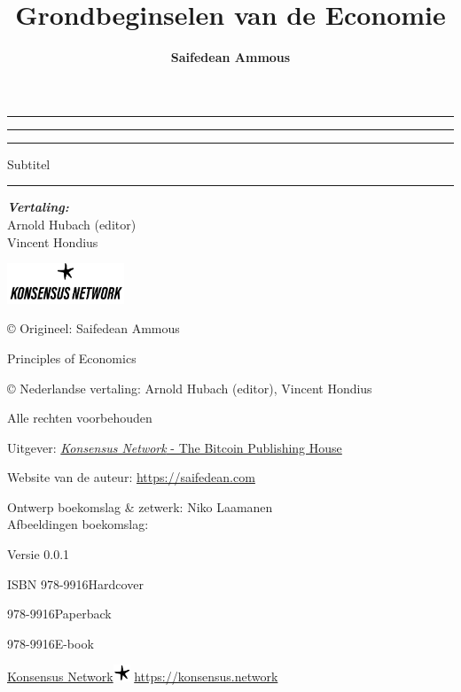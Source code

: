 \documentclass[smalldemyvopaper,10pt,twoside,onecolumn,openright,extrafontsizes]{memoir}
\title{Grondbeginselen van de Economie}
\author{\textbf{Saifedean Ammous}}
\newcommand{\subtitle}{Subtitel}
\newcommand{\ISBNHC}{978-9916}
\newcommand{\ISBNSC}{978-9916}
\newcommand{\ISBNEBOOK}{978-9916}
\newcommand{\press}{Konsensus Network}
\newcommand{\editor}{Arnold Hubach (editor)}
\newcommand{\translatorone}{Vincent Hondius}
\newcommand{\translators}{
\textbf{Vertaling:}\\
\editor\\
\translatorone\\

}
\newcommand*\halftitlepage{\begingroup %
  \setlength\drop{0.1\textheight}
  \begin{center}
  \vspace*{\drop}
  \rule{\textwidth}{0in}\par
  {\Large\textsc\thetitle\par}
  \rule{\textwidth}{0in}\par
  \vfill
  \end{center}
\endgroup}
\newlength\drop
\newcommand*\titleM{\begingroup %
  \setlength\drop{0.15\textheight}
  \begin{center}
  \vspace*{\drop}
  \rule{\textwidth}{0in}\par
  {\huge\textsc\thetitle\par}
  {\Large\textsc\subtitle\par}
  \rule{5.5cm}{0.3mm}\par
  {\large\textit\theauthor\par}
  \vspace{2mm}
  {\footnotesize\textit\translators\par}
  \vfill
  \includegraphics[width=3.5cm]{figures/knw.png}\par
  \end{center}
\endgroup}
\begin{document}
\makeatletter
\renewcommand{\@seccntformat}[1]{}
\makeatother


\frontmatter
\pagestyle{empty}
\halftitlepage
\cleardoublepage
\titleM
\clearpage
\vphantom{just for the drop}
\vfill

\begin{scriptsize}
\noindent \copyright{} Origineel: Saifedean Ammous
\par\noindent Principles of Economics

\vspace{0.5\baselineskip}

\noindent \copyright{} Nederlandse vertaling: \editor,
\translatorone
\par\noindent \thetitle

\vspace{0.5\baselineskip}

\noindent Alle rechten voorbehouden

\vspace{0.5\baselineskip}

\noindent Uitgever: \href{https://konsensus.network}{\textit{Konsensus Network} - The Bitcoin Publishing House}

\vspace{0.5\baselineskip}

\noindent Website van de auteur: \url{https://saifedean.com}

\vspace{0.5\baselineskip}

\noindent Ontwerp boekomslag \& zetwerk: Niko Laamanen \\
\noindent Afbeeldingen boekomslag: 

\vspace{0.5\baselineskip}

\noindent Versie 0.0.1

\vspace{0.5\baselineskip}

\setlength{\parindent}{2em}%
\noindent ISBN \ISBNHC \:Hardcover

\hspace{0.28\parindent}\ISBNSC \:Paperback

\hspace{0.28\parindent}\ISBNEBOOK \:E-book
\setlength{\parindent}{0pt}

\end{scriptsize}
\vspace{3em}
\noindent \href{https://konsensus.network}{\large\MakeUppercase \press  \hfill \includegraphics[width=0.5cm]{freestarfish.png}} \space\url{https://konsensus.network}
\end{document}
